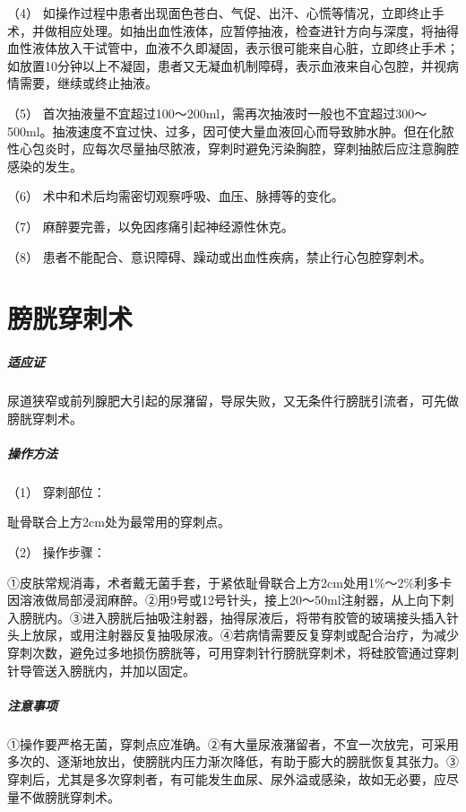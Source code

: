 （4）
如操作过程中患者出现面色苍白、气促、出汗、心慌等情况，立即终止手术，并做相应处理。如抽出血性液体，应暂停抽液，检查进针方向与深度，将抽得血性液体放入干试管中，血液不久即凝固，表示很可能来自心脏，立即终止手术；如放置10分钟以上不凝固，患者又无凝血机制障碍，表示血液来自心包腔，并视病情需要，继续或终止抽液。

（5）
首次抽液量不宜超过100～200ml，需再次抽液时一般也不宜超过300～500ml。抽液速度不宜过快、过多，因可使大量血液回心而导致肺水肿。但在化脓性心包炎时，应每次尽量抽尽脓液，穿刺时避免污染胸腔，穿刺抽脓后应注意胸腔感染的发生。

（6） 术中和术后均需密切观察呼吸、血压、脉搏等的变化。

（7） 麻醉要完善，以免因疼痛引起神经源性休克。

（8） 患者不能配合、意识障碍、躁动或出血性疾病，禁止行心包腔穿刺术。

\protect\hypertarget{text00384.html}{}{}

\section{膀胱穿刺术}

\subparagraph{适应证}

尿道狭窄或前列腺肥大引起的尿潴留，导尿失败，又无条件行膀胱引流者，可先做膀胱穿刺术。

\subparagraph{操作方法}

\hypertarget{text00384.htmlux5cux23CHP16-7-8-2-1}{}
（1） 穿刺部位：

耻骨联合上方2cm处为最常用的穿刺点。

\hypertarget{text00384.htmlux5cux23CHP16-7-8-2-2}{}
（2） 操作步骤：

①皮肤常规消毒，术者戴无菌手套，于紧依耻骨联合上方2cm处用1\%～2\%利多卡因溶液做局部浸润麻醉。②用9号或12号针头，接上20～50ml注射器，从上向下刺入膀胱内。③进入膀胱后抽吸注射器，抽得尿液后，将带有胶管的玻璃接头插入针头上放尿，或用注射器反复抽吸尿液。④若病情需要反复穿刺或配合治疗，为减少穿刺次数，避免过多地损伤膀胱等，可用穿刺针行膀胱穿刺术，将硅胶管通过穿刺针导管送入膀胱内，并加以固定。

\subparagraph{注意事项}

①操作要严格无菌，穿刺点应准确。②有大量尿液潴留者，不宜一次放完，可采用多次的、逐渐地放出，使膀胱内压力渐次降低，有助于膨大的膀胱恢复其张力。③穿刺后，尤其是多次穿刺者，有可能发生血尿、尿外溢或感染，故如无必要，应尽量不做膀胱穿刺术。

\protect\hypertarget{text00385.html}{}{}

